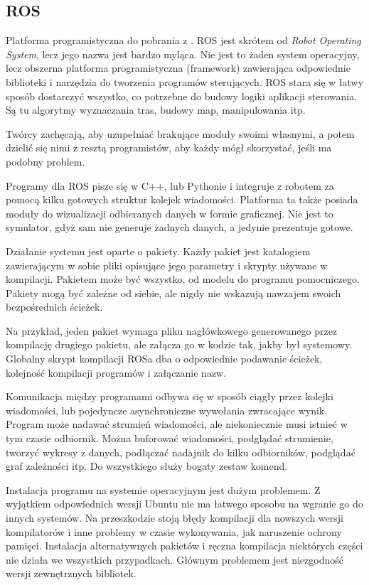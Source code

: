 	\subsection{ROS}
	Platforma programistyczna do pobrania z \cite{ros_website}.
	ROS jest skrótem od \emph{Robot Operating System}, lecz jego nazwa jest bardzo myląca.
	Nie jest to żaden system operacyjny, lecz obszerna platforma programistyczna (framework) zawierająca odpowiednie biblioteki i narzędzia do tworzenia programów sterujących.
	ROS stara się w łatwy sposób dostarczyć wszystko, co potrzebne do budowy logiki aplikacji sterowania.
	Są tu algorytmy wyznaczania tras, budowy map, manipulowania itp. 

	Twórcy zachęcają, aby uzupełniać brakujące moduły swoimi własnymi, a potem dzielić się nimi z resztą programistów, aby każdy mógł skorzystać, jeśli ma podobny problem.

	Programy dla ROS pisze się w C++, lub Pythonie i integruje z robotem za pomocą kilku gotowych struktur kolejek wiadomości.
	Platforma ta także posiada moduły do wizualizacji odbieranych danych w formie graficznej.
	Nie jest to symulator, gdyż sam nie generuje żadnych danych, a jedynie prezentuje gotowe.

	Działanie systemu jest oparte o pakiety. Każdy pakiet jest katalogiem zawierającym w sobie pliki opisujące jego parametry i skrypty używane w kompilacji.
	Pakietem może być wszystko, od modelu do programu pomocniczego.
	Pakiety mogą być zależne od siebie, ale nigdy nie wskazują nawzajem swoich bezpośrednich ścieżek.

	Na przykład, jeden pakiet wymaga pliku nagłówkowego generowanego przez kompilację drugiego pakietu, ale załącza go w kodzie tak, jakby był systemowy.
	Globalny skrypt kompilacji ROSa dba o odpowiednie podawanie ścieżek, kolejność kompilacji programów i załączanie nazw.

	Komunikacja między programami odbywa się w sposób ciągły przez kolejki wiadomości, lub pojedyncze asynchroniczne wywołania zwracające wynik.
	Program może nadawać strumień wiadomości, ale niekoniecznie musi istnieć w tym czasie odbiornik.
	Można buforować wiadomości, podglądać strumienie, tworzyć wykresy z danych, podłączać nadajnik do kilku odbiorników, podglądać graf zależności itp.
	Do wszystkiego służy bogaty zestaw komend.

	Instalacja programu na systemie operacyjnym jest dużym problemem.
	Z wyjątkiem odpowiednich wersji Ubuntu nie ma łatwego sposobu na wgranie go do innych systemów.
	Na przeszkodzie stoją błędy kompilacji dla nowszych wersji kompilatorów i inne problemy w czasie wykonywania, jak naruszenie ochrony pamięci. 
	Instalacja alternatywnych pakietów i ręczna kompilacja niektórych części nie działa we wszystkich przypadkach.
	Głównym problemem jest niezgodność wersji zewnętrznych bibliotek.

